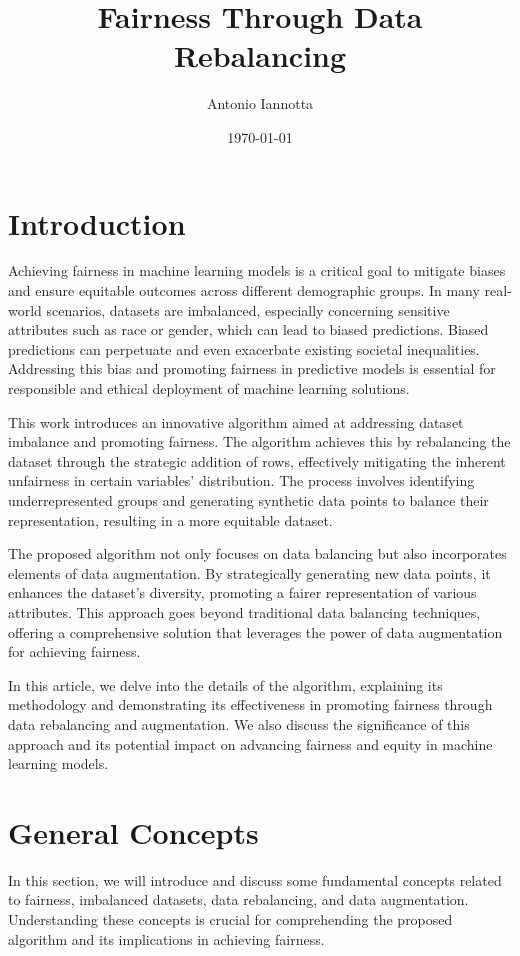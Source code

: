 \documentclass{article}
\title{Fairness Through Data Rebalancing}
\author{Antonio Iannotta}
\date{\today}
\begin{document}
\maketitle

\section{Introduction}
Achieving fairness in machine learning models is a critical goal to mitigate biases and ensure equitable outcomes across different demographic groups. In many real-world scenarios, datasets are imbalanced, especially concerning sensitive attributes such as race or gender, which can lead to biased predictions. Biased predictions can perpetuate and even exacerbate existing societal inequalities. Addressing this bias and promoting fairness in predictive models is essential for responsible and ethical deployment of machine learning solutions.

This work introduces an innovative algorithm aimed at addressing dataset imbalance and promoting fairness. The algorithm achieves this by rebalancing the dataset through the strategic addition of rows, effectively mitigating the inherent unfairness in certain variables' distribution. The process involves identifying underrepresented groups and generating synthetic data points to balance their representation, resulting in a more equitable dataset.

The proposed algorithm not only focuses on data balancing but also incorporates elements of data augmentation. By strategically generating new data points, it enhances the dataset's diversity, promoting a fairer representation of various attributes. This approach goes beyond traditional data balancing techniques, offering a comprehensive solution that leverages the power of data augmentation for achieving fairness.

In this article, we delve into the details of the algorithm, explaining its methodology and demonstrating its effectiveness in promoting fairness through data rebalancing and augmentation. We also discuss the significance of this approach and its potential impact on advancing fairness and equity in machine learning models.

\section{General Concepts}
In this section, we will introduce and discuss some fundamental concepts related to fairness, imbalanced datasets, data rebalancing, and data augmentation. Understanding these concepts is crucial for comprehending the proposed algorithm and its implications in achieving fairness.
\end{document}
